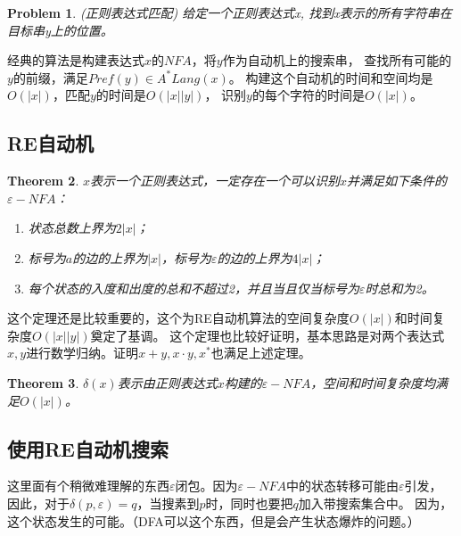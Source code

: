 \documentclass[UTF8]{ctexart}
\newtheorem{thm}{Theorem}[subsection]
\newtheorem{prob}[thm]{Problem}
\theoremstyle{definition}
\theoremstyle{remark}
\numberwithin{equation}{subsection}
\begin{document}
    \begin{prob}
        (正则表达式匹配) 给定一个正则表达式x, 找到x表示的所有字符串在目标串y上的位置。
    \end{prob}
	经典的算法是构建表达式$x$的$NFA$，将$y$作为自动机上的搜索串，
	查找所有可能的$y$的前缀，满足$Pref(y) \in A^*Lang(x)$。
	构建这个自动机的时间和空间均是$O(|x|)$，匹配$y$的时间是$O(|x||y|)$，
	识别$y$的每个字符的时间是$O(|x|)$。
	
\subsection{RE自动机}

	\begin{thm} $x$表示一个正则表达式，一定存在一个可以识别$x$并满足如下条件的$\varepsilon-NFA$：
		\begin{enumerate}[(1)]
		
			\item 状态总数上界为$2|x|$；
			
			\item 标号为$a$的边的上界为$|x|$，标号为$\varepsilon$的边的上界为$4|x|$；
			
			\item 每个状态的入度和出度的总和不超过2，并且当且仅当标号为$\varepsilon$时总和为2。
			
		\end{enumerate}
	\end{thm}
	
	这个定理还是比较重要的，这个为RE自动机算法的空间复杂度$O(|x|)$和时间复杂度$O(|x||y|)$奠定了基调。
	这个定理也比较好证明，基本思路是对两个表达式$x,y$进行数学归纳。证明$x+y, x \cdot y, x^*$也满足上述定理。
	
	\begin{thm}
		$\delta(x)$表示由正则表达式$x$构建的$\varepsilon-NFA$，空间和时间复杂度均满足$O(|x|)$。
	\end{thm}
	
\subsection{使用RE自动机搜索}

	这里面有个稍微难理解的东西$\varepsilon 闭包$。因为$\varepsilon-NFA$中的状态转移可能由$\varepsilon$引发，
	因此，对于$\delta(p,\varepsilon) = q$，当搜素到$p$时，同时也要把$q$加入带搜索集合中。
	因为，这个状态发生的可能。（DFA可以这个东西，但是会产生状态爆炸的问题。）
	
\end{document}
